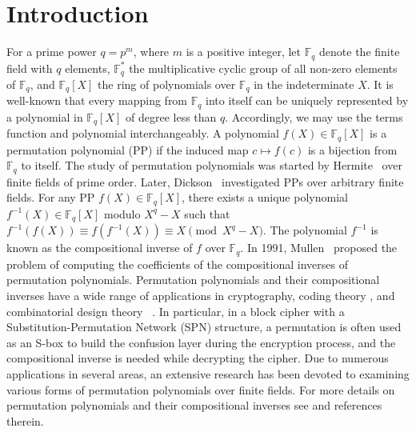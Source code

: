 \documentclass[11pt]{amsart}
\theoremstyle{plain}
\numberwithin{equation}{section}
\theoremstyle{definition}
\newcommand{\F}{\mathbb F}
\begin{document}
\section{Introduction}
For a prime power $q=p^m$, where $m$ is a positive integer, let $\F_q$ denote the finite field with $q$ elements, $\F_q^*$  the multiplicative cyclic group of all non-zero elements of $\F_q$, and $\F_q[X]$ the ring of polynomials over $\F_q$ in the indeterminate $X$. It is well-known that every mapping from $\F_{q}$ into itself can be uniquely represented by a polynomial in $\F_{q}[X]$ of degree less than $q$. Accordingly, we may use the terms function and polynomial interchangeably. A polynomial $f(X)\in \F_q[X]$ is a permutation polynomial (PP) if the induced map $c \mapsto f(c)$ is a bijection from $\F_q$ to itself. The study of permutation polynomials was started by Hermite~\cite{CC} over finite fields of prime order. Later, Dickson~\cite{LE} investigated PPs over arbitrary finite fields. For any PP $f(X)\in \F_q[X]$, there exists a unique  polynomial $f^{-1}(X)\in \F_q[X]$ modulo $X^q-X$ such that $f^{-1}(f(X))\equiv f(f^{-1}(X))\equiv X \pmod{X^q-X}$. The polynomial  $f^{-1}$ is known as the compositional inverse of $f$ over $\F_q$. In 1991, Mullen~\cite{M} proposed the problem of computing the coefficients of the compositional inverses of permutation polynomials. Permutation polynomials and their compositional inverses have a wide range of applications in cryptography\cite{RSA,Schwenk_Cr_98}, coding theory \cite{DH,Chapuy_C_07}, and combinatorial design theory ~\cite{DY}.  In particular, in a block cipher with a Substitution-Permutation Network (SPN) structure,  a permutation is often used as an S-box to build the confusion layer during the encryption process, and the compositional inverse is needed while decrypting the cipher. Due to numerous applications in several areas, an extensive research has been devoted to examining various forms of permutation polynomials over finite fields. For more details on permutation polynomials and their compositional inverses see \cite{CK, JLQ, SRK, Hou_PP_15, W} and references therein.
\end{document}
